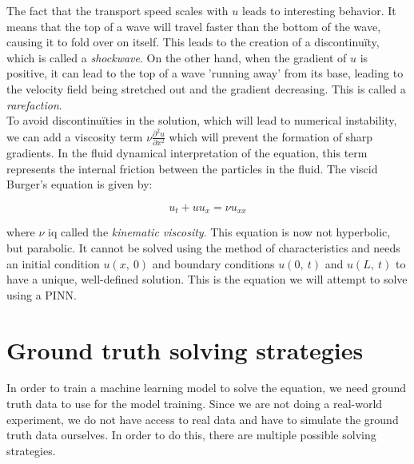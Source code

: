\documentclass[we,twoside,openright,a4paper,11pt]{uantwerpenbamathesis}
\begin{document}
The fact that the transport speed scales with $u$ leads to interesting behavior. It means that the top of a wave will travel faster than the bottom of the wave, causing it to fold over on itself. This leads to the creation of a discontinuïty, which is called a \textit{shockwave}. On the other hand, when the gradient of $u$ is positive, it can lead to the top of a wave 'running away' from its base, leading to the velocity field being stretched out and the gradient decreasing. This is called a \textit{rarefaction}.\\

To avoid discontinuïties in the solution, which will lead to numerical instability, we can add a viscosity term $\nu\frac{\partial^2 u}{\partial x^2}$ which will prevent the formation of sharp gradients. In the fluid dynamical interpretation of the equation, this term represents the internal friction between the particles in the fluid. The viscid Burger's equation is given by:

\begin{equation}
    u_t + uu_x = \nu u_{xx}
\end{equation}

where $\nu$ iq called the \textit{kinematic viscosity}. This equation is now not hyperbolic, but parabolic. It cannot be solved using the method of characteristics and needs an initial condition $u(x,\ 0)$ and boundary conditions $u(0,\ t)$ and $u(L,\ t)$ to have a unique, well-defined solution. This is the equation we will attempt to solve using a PINN. 

\section{Ground truth solving strategies}
In order to train a machine learning model to solve the equation, we need ground truth data to use for the model training. Since we are not doing a real-world experiment, we do not have access to real data and have to simulate the ground truth data ourselves. In order to do this, there are multiple possible solving strategies.
\end{document}
